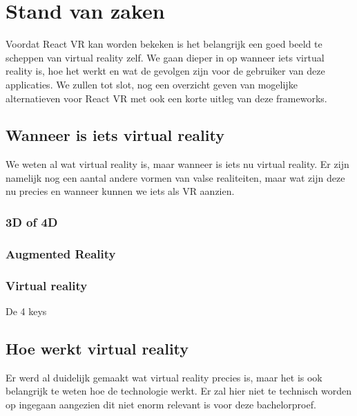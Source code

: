 \chapter{Stand van zaken}
\label{ch:stand-van-zaken}



Voordat React VR kan worden bekeken is het belangrijk een goed beeld te scheppen van virtual reality zelf. We gaan dieper in op wanneer iets virtual reality is, hoe het werkt en wat de gevolgen zijn voor de gebruiker van deze applicaties. We zullen tot slot, nog een overzicht geven van mogelijke alternatieven voor React VR met ook een korte uitleg van deze frameworks.

\section{Wanneer is iets virtual reality}
We weten al wat virtual reality is, maar wanneer is iets nu virtual reality. Er zijn namelijk nog een aantal andere vormen van valse realiteiten, maar wat zijn deze nu precies en wanneer kunnen we iets als VR aanzien.

\subsection{3D of 4D}
\subsection{Augmented Reality}
\subsection{Virtual reality}
De 4 keys

\section{Hoe werkt virtual reality}
Er werd al duidelijk gemaakt wat virtual reality precies is, maar het is ook belangrijk te weten hoe de technologie werkt. Er zal hier niet te technisch worden op ingegaan aangezien dit niet enorm relevant is voor deze bachelorproef.

